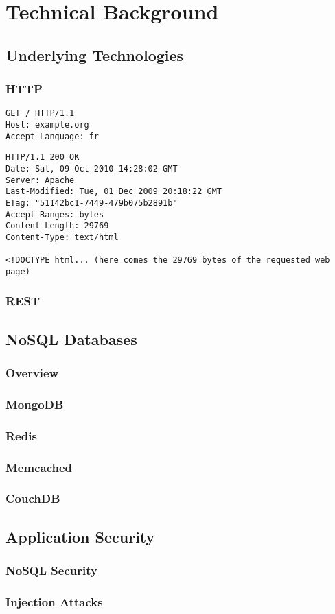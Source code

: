 \chapter{Technical Background}
\label{cha:technicalBackground}

\section{Underlying Technologies}
\subsection{HTTP}

\begin{lstlisting}[caption={HTTP GET request}, label={lst:http_request}]
GET / HTTP/1.1
Host: example.org
Accept-Language: fr
\end{lstlisting}

\begin{lstlisting}[caption={HTTP response}, label={lst:http_response}]
HTTP/1.1 200 OK
Date: Sat, 09 Oct 2010 14:28:02 GMT
Server: Apache
Last-Modified: Tue, 01 Dec 2009 20:18:22 GMT
ETag: "51142bc1-7449-479b075b2891b"
Accept-Ranges: bytes
Content-Length: 29769
Content-Type: text/html

<!DOCTYPE html... (here comes the 29769 bytes of the requested web page)
\end{lstlisting}

\subsection{REST}

\section{NoSQL Databases}
\subsection{Overview}
\subsection{MongoDB}
\subsection{Redis}
\subsection{Memcached}
\subsection{CouchDB}

\section{Application Security}
\subsection{NoSQL Security}
\subsection{Injection Attacks}